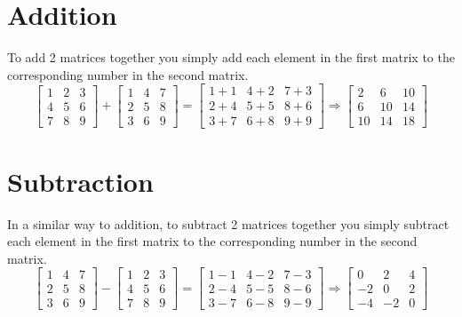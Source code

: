 \documentclass{article}
\begin{document}
\section{Addition}
To add 2 matrices together you simply add each element in the first matrix to the corresponding number in the second matrix.
\begin{equation*}
	\left[
		\begin{matrix}
			1 & 2 & 3\\
			4 & 5 & 6\\
			7 & 8 & 9
		\end{matrix}
	\right]
	+
	\left[
		\begin{matrix}
			1 & 4 & 7\\
			2 & 5 & 8\\
			3 & 6 & 9
		\end{matrix}
	\right]
	=
	\left[
		\begin{matrix}
			1+1 & 4+2 & 7+3\\
			2+4 & 5+5 & 8+6\\
			3+7 & 6+8 & 9+9
		\end{matrix}
	\right]
	\Rightarrow
	\left[
		\begin{matrix}
			2 & 6 & 10\\
			6 & 10 & 14\\
			10 & 14 & 18
		\end{matrix}
	\right]
\end{equation*}
\section{Subtraction}
In a similar way to addition, to subtract 2 matrices together you simply subtract each element in the first matrix to the corresponding number in the second matrix.
\begin{equation*}
	\left[
		\begin{matrix}
			1 & 4 & 7\\
			2 & 5 & 8\\
			3 & 6 & 9
			\end{matrix}
	\right]
	-
	\left[
		\begin{matrix}
			1 & 2 & 3\\
			4 & 5 & 6\\
			7 & 8 & 9
		\end{matrix}
	\right]
	=
	\left[
		\begin{matrix}
			1-1 & 4-2 & 7-3\\
			2-4 & 5-5 & 8-6\\
			3-7 & 6-8 & 9-9
		\end{matrix}
	\right]
	\Rightarrow
	\left[
		\begin{matrix}
			0 & 2 & 4\\
			-2 & 0 & 2\\
			-4 & -2 & 0
		\end{matrix}
	\right]
\end{equation*}
\end{document}
